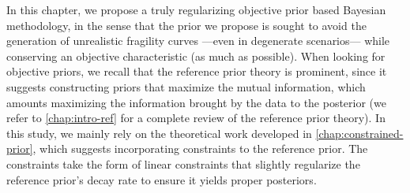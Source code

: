 






In this chapter, we propose a truly regularizing objective prior based Bayesian methodology, in the sense that the prior we propose is sought to avoid the generation of unrealistic fragility curves ---even in degenerate scenarios--- while conserving an objective characteristic (as much as possible).
When looking for objective priors, we recall that the reference prior theory is prominent, since it suggests constructing priors that maximize the mutual information,  which amounts maximizing the information brought by the data to the posterior (we refer to   \cref{chap:intro-ref} for a complete review of the reference prior theory).
In this study, we
mainly rely on the theoretical work developed in   \cref{chap:constrained-prior}, which suggests incorporating constraints to the reference prior. %
The constraints %
take the form of linear constraints that slightly regularize the reference prior's decay rate to ensure it yields proper posteriors.


